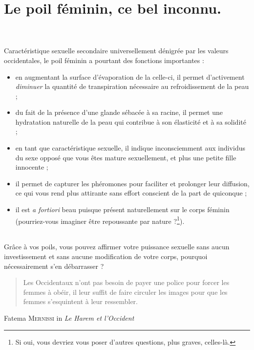 \documentclass[a4paper,11pt]{article}
\begin{document}
\pagestyle {empty} %

\part*{Le poil féminin, ce bel inconnu.}\\
\\
Caractéristique sexuelle secondaire universellement dénigrée par les valeurs
occidentales, le poil féminin a pourtant des fonctions importantes : \\

\begin{itemize}
\item en augmentant la surface d’évaporation de la celle-ci, il permet
d’activement \emph{diminuer} la quantité de transpiration nécessaire au
refroidissement de la peau ;
\item du fait de la présence d’une glande sébacée à sa racine, il permet une
hydratation naturelle de la peau qui contribue à son élasticité et à sa
solidité ;
\item en tant que caractéristique sexuelle, il indique inconsciemment aux
individus du sexe opposé que vous êtes mature sexuellement, et plus une petite
fille innocente ;
\item il permet de capturer les phéromones pour faciliter et prolonger leur
diffusion, ce qui vous rend plus attirante sans effort conscient de la part de
quiconque ;
\item il est \emph{a fortiori} beau puisque présent naturellement sur le corps
féminin (pourriez-vous imaginer être repoussante par nature ?\footnote{Si oui,
vous devriez vous poser d’autres questions, plus graves, celles-là.}).
\end{itemize}
\\
Grâce à vos poils, vous pouvez affirmer votre puissance sexuelle sans aucun
investissement et sans aucune modification de votre corps, pourquoi
nécessairement s’en débarrasser ?

\begin{quote}
Les Occidentaux n'ont pas besoin de payer une police pour forcer les femmes à
obéir, il leur suffit de faire circuler les images pour que les femmes
s'esquintent à leur ressembler.
\end{quote}
Fatema \textsc{Mernissi} in \emph{Le Harem et l'Occident}
\end{document}
